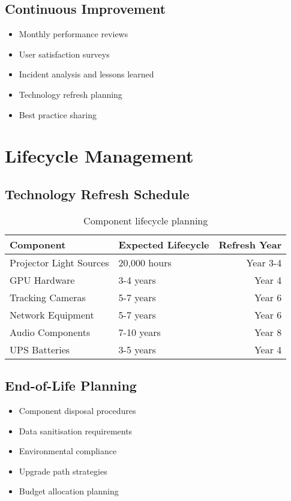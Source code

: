 \subsection{Continuous Improvement}

\begin{itemize}
    \item Monthly performance reviews
    \item User satisfaction surveys
    \item Incident analysis and lessons learned
    \item Technology refresh planning
    \item Best practice sharing
\end{itemize}

\section{Lifecycle Management}

\subsection{Technology Refresh Schedule}

\begin{table}[H]
\centering
\begin{tabularx}{\textwidth}{@{}lXr@{}}
\toprule
\textbf{Component} & \textbf{Expected Lifecycle} & \textbf{Refresh Year} \\
\midrule
Projector Light Sources & 20,000 hours & Year 3-4 \\
GPU Hardware & 3-4 years & Year 4 \\
Tracking Cameras & 5-7 years & Year 6 \\
Network Equipment & 5-7 years & Year 6 \\
Audio Components & 7-10 years & Year 8 \\
UPS Batteries & 3-5 years & Year 4 \\
\bottomrule
\end{tabularx}
\caption{Component lifecycle planning}
\end{table}

\subsection{End-of-Life Planning}

\begin{itemize}
    \item Component disposal procedures
    \item Data sanitisation requirements
    \item Environmental compliance
    \item Upgrade path strategies
    \item Budget allocation planning
\end{itemize}

